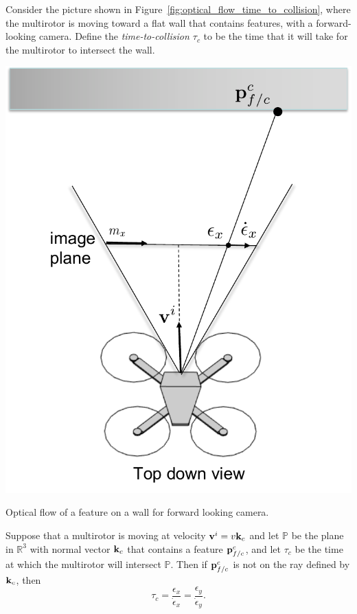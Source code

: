 %
Consider the picture shown in Figure~\ref{fig:optical_flow_time_to_collision}, where the multirotor is moving toward a flat wall that contains features, with a forward-looking camera.  Define the {\em time-to-collision $\tau_c$} to be the time that it will take for the multirotor to intersect the wall.
\begin{marginfigure}
	\includegraphics[width=\linewidth]{chap7_optical_flow/figures/optical_flow_time_to_collision}
	\caption{Optical flow of a feature on a wall for forward looking camera.}
	\label{fig:optical_flow_time_to_collision}
\end{marginfigure}  
\begin{theorem}
	Suppose that a multirotor is moving at velocity $\mathbf{v}^i = v\mathbf{k}_c$ and let $\mathbb{P}$ be the plane in $\mathbb{R}^3$ with normal vector $\mathbf{k}_c$ that contains a feature $\mathbf{p}_{f/c}^c$, and let $\tau_c$ be the time at which the multirotor will intersect $\mathbb{P}$.  Then if $\mathbf{p}_{f/c}^c$ is not on the ray defined by $\mathbf{k}_c$, then
	\begin{equation}\label{eq:optical_flow_time_to_collision}
	\tau_c = \frac{\epsilon_x}{\dot{\epsilon}_x} =  \frac{\epsilon_y}{\dot{\epsilon}_y}.
	\end{equation}
\end{theorem}
